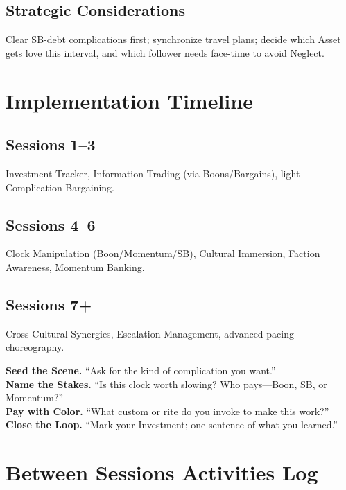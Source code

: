 \begin{multicols}{2}
\subsection{Strategic Considerations}
Clear SB-debt complications first; synchronize travel plans; decide which Asset gets love this interval, and which follower needs face-time to avoid Neglect.

\section{Implementation Timeline}

\subsection*{Sessions 1–3}
Investment Tracker, Information Trading (via Boons/Bargains), light Complication Bargaining.

\subsection*{Sessions 4–6}
Clock Manipulation (Boon/Momentum/SB), Cultural Immersion, Faction Awareness, Momentum Banking.

\subsection*{Sessions 7+}
Cross-Cultural Synergies, Escalation Management, advanced pacing choreography.

\begin{tcolorbox}[colback=blue!5!white,colframe=blue!75!black,title=At-Table Prompts,fonttitle=\bfseries]
\textbf{Seed the Scene.} “Ask for the kind of complication you want.”\\
\textbf{Name the Stakes.} “Is this clock worth slowing? Who pays—Boon, SB, or Momentum?”\\
\textbf{Pay with Color.} “What custom or rite do you invoke to make this work?”\\
\textbf{Close the Loop.} “Mark your Investment; one sentence of what you learned.”
\end{tcolorbox}

\section{Between Sessions Activities Log}


\end{multicols}
